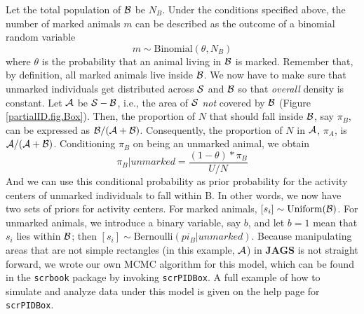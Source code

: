 Let the total population of ${\cal B}$ be $N_B$. %
Under the conditions specified above, the number of marked animals $m$ can be described as the outcome of a binomial random variable
\[
m \sim \mbox{Binomial}(\theta, N_B)
\]
where $\theta$ is the probability that an animal living in ${\cal B}$ is marked. Remember that, by definition, all marked animals live inside ${\cal B}$. We now have to make sure that unmarked individuals get distributed across ${\cal S}$ and ${\cal B}$ so that \emph{overall} density is constant. %
Let ${\cal A}$ be ${\cal S} - {\cal B}$, %
i.e., the area of ${\cal S}$ \emph{not} covered by ${\cal B}$ (Figure \ref{partialID.fig.Box}). Then, the proportion of $N$ that should fall inside ${\cal B}$, say $\pi_B$, can be expressed as ${\cal B}/({\cal A}+{\cal B})$. Consequently, the proportion of $N$ in ${\cal A}$, $\pi_A$,
is ${\cal A}/({\cal A}+{\cal B})$.
Conditioning $\pi_B$ on being an unmarked animal, %
we obtain
\[
 \pi_B | unmarked = \frac{(1-\theta)* \pi_B}{U/N}
\]
And we can use this conditional probability as prior probability for the activity centers of unmarked individuals to fall within {\cal B}.
In other words, we now have two sets of priors for activity centers.
For marked animals, $[s_i]\sim \mbox{Uniform}({\cal B})$. For unmarked animals, we introduce a binary variable, say $b$, and let $b=1$ mean that $s_i$ lies within ${\cal B}$; then $[s_i]\sim \mbox{Bernoulli}(pi_B|unmarked)$.
Because manipulating areas that are not simple rectangles (in this example, ${\cal A}$) in {\bf JAGS} is not straight forward, we wrote our own MCMC algorithm for this model, which can be found in the {\tt scrbook} package by invoking {\tt scrPIDBox}. A full example of how to simulate and analyze data under this model is given on the help page for {\tt scrPIDBox}.

